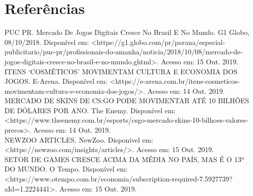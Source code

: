 \documentclass[a4paper, 12pt]{article}
\begin{document}
    \newpage %
    \section{Referências}
    \noindent
    PUC PR. Mercado De Jogos Digitais Cresce No Brasil E No Mundo. G1 Globo, 08/10/2018. Disponível em: \textless https://g1.globo.com/pr/parana/especial-publicitario/puc-pr/profissionais-do-amanha/noticia/2018/10/08/mercado-de-jogos-digitais-cresce-no-brasil-e-no-mundo.ghtml\textgreater. Acesso em: 15 Out. 2019. \\
    
    \noindent
    ITENS ‘COSMÉTICOS’ MOVIMENTAM CULTURA E ECONOMIA DOS JOGOS. E-Arena. Disponível em: \textless https://e-arena.com.br/itens-cosmeticos-movimentam-cultura-e-economia-dos-jogos/\textgreater. Acesso em: 14 Out. 2019. \\
    
    \noindent
    MERCADO DE SKINS DE CS:GO PODE MOVIMENTAR ATÉ 10 BILHÕES DE DÓLARES POR ANO. The Enemy. Disponível em:\textless https://www.theenemy.com.br/esports/csgo-mercado-skins-10-bilhoes-valores-precos\textgreater. Acesso em: 14 Out. 2019. \\
    
    \noindent
    NEWZOO ARTICLES. NewZoo. Disponível em: \textless https://newzoo.com/insights/articles/\textgreater. Acesso em: 15 Out. 2019. \\
    
    \noindent
    SETOR DE GAMES CRESCE ACIMA DA MÉDIA NO PAÍS, MAS É O 13º DO MUNDO. O Tempo. Disponível em: \textless https://www.otempo.com.br/economia/subscription-required-7.5927739?aId=1.2224441\textgreater. Acesso em: 15 Out. 2019. \\
\end{document}
